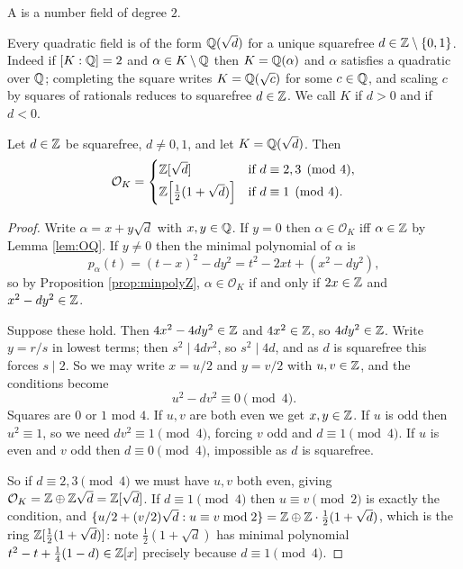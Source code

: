 \documentclass[a4paper]{scrartcl}
\renewcommand{\OO}{\mathcal{O}}
\begin{document}
\begin{definition}
	A  is a number field of degree $2$.
\end{definition}

Every quadratic field is of the form $\mathbb{Q}(\sqrt{d})$ for a unique squarefree $d \in \mathbb{Z} \setminus \{0,1\}$. Indeed if $[K:\mathbb{Q}] = 2$ and $\alpha \in K \setminus \mathbb{Q}$ then $K = \mathbb{Q}(\alpha)$ and $\alpha$ satisfies a quadratic over $\mathbb{Q}$; completing the square writes $K = \mathbb{Q}(\sqrt{c})$ for some $c \in \mathbb{Q}$, and scaling $c$ by squares of rationals reduces to squarefree $d \in \mathbb{Z}$. We call $K$  if $d > 0$ and  if $d < 0$.

\begin{lemma}\label{lem:quadOK}
	Let $d \in \mathbb{Z}$ be squarefree, $d \neq 0, 1$, and let $K = \mathbb{Q}(\sqrt d)$. Then
	$$\OO_K = \begin{cases} \Z[\sqrt d] & \text{if } d \equiv 2, 3 \pmod 4,\\[2pt] \Z\!\left[\tfrac{1}{2}(1+\sqrt d)\right] & \text{if } d \equiv 1 \pmod 4.\end{cases}$$
\end{lemma}

\begin{proof}
	Write $\alpha = x + y\sqrt d$ with $x, y \in \mathbb{Q}$. If $y = 0$ then $\alpha \in \OO_K$ iff $\alpha \in \mathbb{Z}$ by Lemma \ref{lem:OQ}. If $y \neq 0$ then the minimal polynomial of $\alpha$ is
	$$p_\alpha(t) = (t - x)^2 - dy^2 = t^2 - 2xt + (x^2 - dy^2),$$
	so by Proposition \ref{prop:minpolyZ}, $\alpha \in \OO_K$ if and only if $2x \in \mathbb{Z}$ and $x^2 - dy^2 \in \mathbb{Z}$.

	Suppose these hold. Then $4x^2 - 4dy^2 \in \mathbb{Z}$ and $4x^2 \in \mathbb{Z}$, so $4dy^2 \in \mathbb{Z}$. Write $y = r/s$ in lowest terms; then $s^2 \mid 4dr^2$, so $s^2 \mid 4d$, and as $d$ is squarefree this forces $s \mid 2$. So we may write $x = u/2$ and $y = v/2$ with $u, v \in \mathbb{Z}$, and the conditions become
	$$u^2 - dv^2 \equiv 0 \pmod 4.$$
	Squares are $0$ or $1$ mod $4$. If $u, v$ are both even we get $x, y \in \mathbb{Z}$. If $u$ is odd then $u^2 \equiv 1$, so we need $dv^2 \equiv 1 \pmod 4$, forcing $v$ odd and $d \equiv 1 \pmod 4$. If $u$ is even and $v$ odd then $d \equiv 0 \pmod 4$, impossible as $d$ is squarefree.

	So if $d \equiv 2, 3 \pmod 4$ we must have $u, v$ both even, giving $\OO_K = \Z \oplus \Z\sqrt d = \Z[\sqrt d]$. If $d \equiv 1 \pmod 4$ then $u \equiv v \pmod 2$ is exactly the condition, and $\{u/2 + (v/2)\sqrt d : u \equiv v \bmod 2\} = \mathbb{Z} \oplus \mathbb{Z}\cdot\tfrac12(1+\sqrt d)$, which is the ring $\mathbb{Z}[\tfrac12(1+\sqrt d)]$: note $\tfrac12(1+\sqrt d)$ has minimal polynomial $t^2 - t + \tfrac14(1-d) \in \mathbb{Z}[x]$ precisely because $d \equiv 1 \pmod 4$.
\end{proof}
\end{document}
